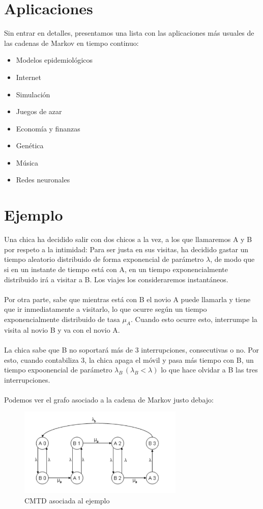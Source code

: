 \documentclass[12pt,a4paper]{article}
\begin{document}
\section{Aplicaciones}
Sin entrar en detalles, presentamos una lista con las aplicaciones más usuales de las cadenas de Markov en tiempo continuo:
\begin{itemize}
\item Modelos epidemiológicos
\item Internet
\item Simulación
\item Juegos de azar
\item Economía y finanzas
\item Genética
\item Música
\item Redes neuronales
\end{itemize}
\newpage
\section{Ejemplo}
Una chica ha decidido salir con dos chicos a la vez, a los que llamaremos A y B por respeto a la intimidad: Para ser justa en sus visitas, ha decidido gastar un tiempo aleatorio distribuido de forma exponencial de parámetro $\lambda$, de modo que si en un instante de tiempo está con A, en un tiempo exponencialmente distribuido irá a visitar a B. Los viajes los consideraremos instantáneos. 
\\\\
Por otra parte, sabe que mientras está con B el novio A puede llamarla y tiene que ir inmediatamente a visitarlo, lo que ocurre según un tiempo exponencialmente distribuido de tasa $\mu_A$. Cuando esto ocurre esto, interrumpe la visita al novio B y va con el novio A.
\\\\
La chica sabe que B no soportará más de 3 interrupciones, consecutivas o no. Por esto, cuando contabiliza 3, la chica apaga el móvil y pasa más tiempo con B, un tiempo expoonencial de parámetro $\lambda_B\, (\lambda_B <\lambda)$ lo que hace olvidar a B las tres interrupciones.
\\\\
Podemos ver el grafo asociado a la cadena de Markov justo debajo:
\begin{figure}[h]
  \centering
    \includegraphics[width=0.7\textwidth]{img/ejemplo.png}
  \caption{CMTD asociada al ejemplo}
  \label{fig:ejemplo}
\end{figure}
\end{document}
